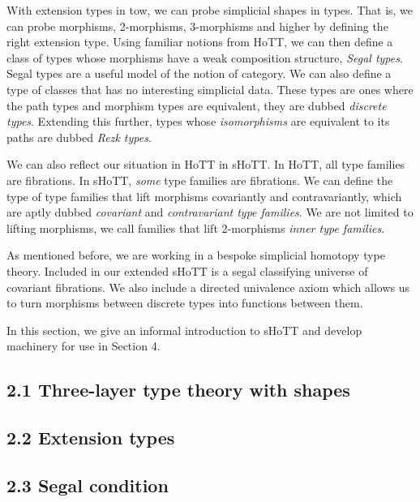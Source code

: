 \documentclass{article}
\theoremstyle{named}
\theoremstyle{remark}
\theoremstyle{definition}
\begin{document}
 With extension types in tow, we can probe simplicial shapes in types. That is, we can probe morphisms, 2-morphisms, 3-morphisms and higher by defining the right extension type. Using familiar notions from HoTT, we can then define a class of types whose morphisms have a weak composition structure, \textit{Segal types}. Segal types are a useful model of the notion of category. We can also define a type of classes that has no interesting simplicial data. These types are ones where the path types and morphism types are equivalent, they are dubbed \textit{discrete types}. Extending this further, types whose \textit{isomorphisms} are equivalent to its paths are dubbed \textit{Rezk types}. 


We can also reflect our situation in HoTT in sHoTT. In HoTT, all type families are fibrations. In sHoTT, \textit{some} type families are fibrations. We can define the type of type families that lift morphisms covariantly and contravariantly, which are aptly dubbed \textit{covariant} and \textit{contravariant type families}. We are not limited to lifting morphisms, we call families that lift 2-morphisms \textit{inner type families}. 

As mentioned before, we are working in a bespoke simplicial homotopy type theory. Included in our extended sHoTT is a segal classifying universe of covariant fibrations. We also include a directed univalence axiom which allows us to turn morphisms between discrete types into functions between them. 

In this section, we give an informal introduction to sHoTT and develop machinery for use in Section 4.
\subsection*{2.1 Three-layer type theory with shapes}

\setcounter{theorem}{0}


\subsection*{2.2 Extension types}

\setcounter{theorem}{0}


\subsection*{2.3 Segal condition}

\setcounter{theorem}{0}
\end{document}
